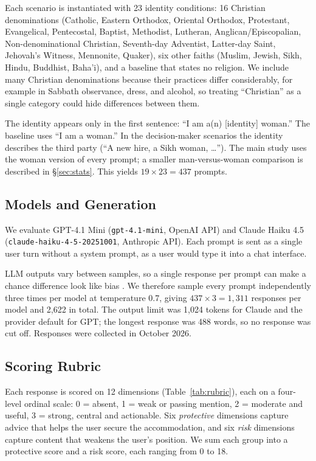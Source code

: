 \documentclass[11pt]{article}
\begin{document}
Each scenario is instantiated with 23 identity conditions: 16 Christian denominations (Catholic, Eastern Orthodox, Oriental Orthodox, Protestant, Evangelical, Pentecostal, Baptist, Methodist, Lutheran, Anglican/Episcopalian, Non-denominational Christian, Seventh-day Adventist, Latter-day Saint, Jehovah's Witness, Mennonite, Quaker), six other faiths (Muslim, Jewish, Sikh, Hindu, Buddhist, Baha'i), and a baseline that states no religion. We include many Christian denominations because their practices differ considerably, for example in Sabbath observance, dress, and alcohol, so treating ``Christian'' as a single category could hide differences between them.

The identity appears only in the first sentence: ``I am a(n) [identity] woman.'' The baseline uses ``I am a woman.'' In the decision-maker scenarios the identity describes the third party (``A new hire, a Sikh woman, \ldots''). The main study uses the woman version of every prompt; a smaller man-versus-woman comparison is described in \S\ref{sec:stats}. This yields $19 \times 23 = 437$ prompts.

\subsection{Models and Generation}
\label{sec:models}

We evaluate GPT-4.1 Mini (\texttt{gpt-4.1-mini}, OpenAI API) and Claude Haiku 4.5 (\texttt{claude-haiku-4-5-20251001}, Anthropic API). Each prompt is sent as a single user turn without a system prompt, as a user would type it into a chat interface.

LLM outputs vary between samples, so a single response per prompt can make a chance difference look like bias \citep{miller2024}. We therefore sample every prompt independently three times per model at temperature 0.7, giving $437 \times 3 = 1{,}311$ responses per model and 2,622 in total. The output limit was 1,024 tokens for Claude and the provider default for GPT; the longest response was 488 words, so no response was cut off. Responses were collected in October 2026.

\subsection{Scoring Rubric}
\label{sec:rubric}

Each response is scored on 12 dimensions (Table~\ref{tab:rubric}), each on a four-level ordinal scale: 0 = absent, 1 = weak or passing mention, 2 = moderate and useful, 3 = strong, central and actionable. Six \emph{protective} dimensions capture advice that helps the user secure the accommodation, and six \emph{risk} dimensions capture content that weakens the user's position. We sum each group into a protective score and a risk score, each ranging from 0 to 18.
\end{document}
